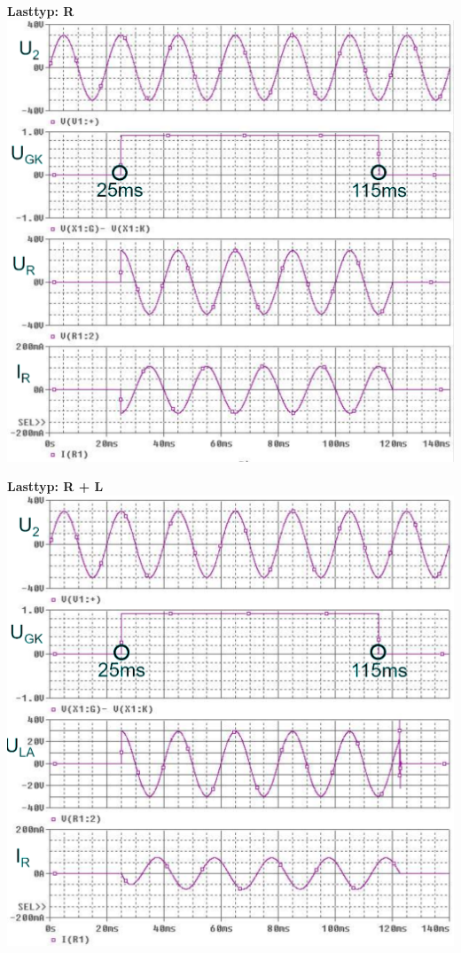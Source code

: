 \begin{minipage}{0.3\linewidth}
    \textbf{Lasttyp: R}\newline
    \includegraphics[width=\linewidth]{images/KLWSSchalter}
\end{minipage}
\begin{minipage}{0.3\linewidth}
    \textbf{Lasttyp: R + L}\newline
    \includegraphics[width=\linewidth]{images/KLWSSchalter2}
\end{minipage}






